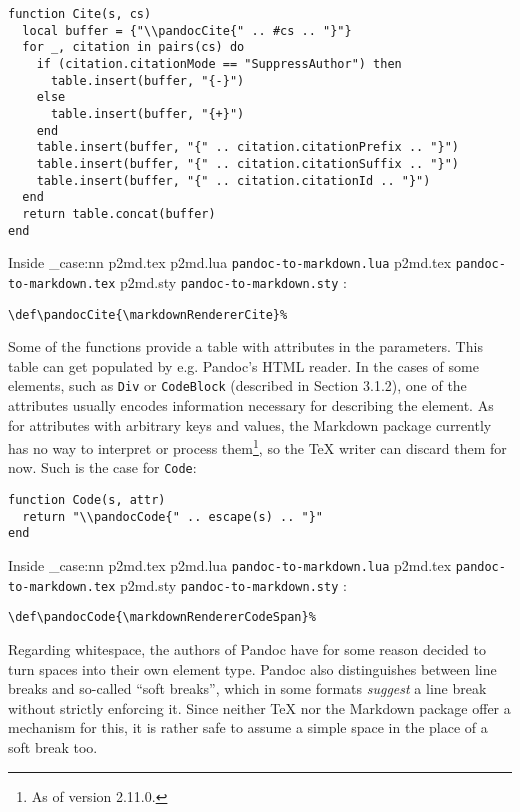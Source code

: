 \documentclass[
  digital,     %
  oneside,     %
  nosansbold,  %
  nocolorbold, %
  lof,         %
  nolot,       %
]{fithesis4}
\newcommand\file[1]
  {
    \str_case:nn
      { #1 }
      {
        { p2md.lua } { \texttt{pandoc\hyp{}to\hyp{}markdown.lua} }
        { p2md.tex } { \texttt{pandoc\hyp{}to\hyp{}markdown.tex} }
        { p2md.sty } { \texttt{pandoc\hyp{}to\hyp{}markdown.sty} }
      }
  }
\begin{document}
\noindent
\lstset{language=[5.3]Lua}
\begin{lstlisting}
function Cite(s, cs)
  local buffer = {"\\pandocCite{" .. #cs .. "}"}
  for _, citation in pairs(cs) do
    if (citation.citationMode == "SuppressAuthor") then
      table.insert(buffer, "{-}")
    else
      table.insert(buffer, "{+}")
    end
    table.insert(buffer, "{" .. citation.citationPrefix .. "}")
    table.insert(buffer, "{" .. citation.citationSuffix .. "}")
    table.insert(buffer, "{" .. citation.citationId .. "}")
  end
  return table.concat(buffer)
end
\end{lstlisting}

\noindent
Inside \file{p2md.tex}:

\noindent
\lstset{language=[plain]TeX}
\begin{lstlisting}
\def\pandocCite{\markdownRendererCite}%
\end{lstlisting}

\noindent
Some of the functions provide a table with attributes in the parameters. This table can get populated by e.g. Pandoc's HTML reader. In the cases of some elements, such as \texttt{Div} or \texttt{CodeBlock} (described in Section 3.1.2), one of the attributes usually encodes information necessary for describing the element. As for attributes with arbitrary keys and values, the Markdown package currently has no way to interpret or process them\footnote{As of version 2.11.0.}, so the \TeX{} writer can discard them for now. Such is the case for \texttt{Code}:

\noindent
\lstset{language=[5.3]Lua}
\begin{lstlisting}
function Code(s, attr)
  return "\\pandocCode{" .. escape(s) .. "}"
end
\end{lstlisting}

\noindent
Inside \file{p2md.tex}:

\noindent
\lstset{language=[plain]TeX}
\begin{lstlisting}
\def\pandocCode{\markdownRendererCodeSpan}%
\end{lstlisting}

\noindent
Regarding whitespace, the authors of Pandoc have for some reason decided to turn spaces into their own element type. Pandoc also distinguishes between line breaks and so-called ``soft breaks'', which in some formats \textit{suggest} a line break without strictly enforcing it. Since neither \TeX{} nor the Markdown package offer a mechanism for this, it is rather safe to assume a simple space in the place of a soft break too.
\end{document}
